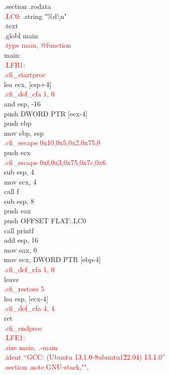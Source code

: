 \documentclass[12pt, letterpaper]{article}
\begin{document}
	\indent .section	.rodata\\
\textcolor{red}{
.LC0:}
	\indent .string	"\%d\textbackslash n"\\
	\indent .text\\
	\indent .globl	main\\
\textcolor{red}{
        \indent .type	main, @function}\\
main:\\
\textcolor{red}{
.LFB1:\\
	\indent .cfi\_startproc}\\
	\indent lea	ecx, [esp+4]\\
\textcolor{red}{
	\indent .cfi\_def\_cfa 1, 0}\\
	\indent and	esp, -16\\
	\indent push	DWORD PTR [ecx-4]\\
	\indent push	ebp\\
	\indent mov	ebp, esp\\
\textcolor{red}{
	\indent .cfi\_escape 0x10,0x5,0x2,0x75,0}\\
	\indent push	ecx\\
\textcolor{red}{
	\indent .cfi\_escape 0xf,0x3,0x75,0x7c,0x6}\\
	\indent sub	esp, 4\\
	\indent mov	ecx, 4\\
	\indent call	f\\
	\indent sub	esp, 8\\
	\indent push	eax\\
	\indent push	OFFSET FLAT:.LC0\\
	\indent call	printf\\
	\indent add	esp, 16\\
	\indent mov	eax, 0\\
	\indent mov	ecx, DWORD PTR [ebp-4]\\
\textcolor{red}{
	\indent .cfi\_def\_cfa 1, 0}\\
	\indent leave\\
\textcolor{red}{
	\indent .cfi\_restore 5}\\
	\indent lea	esp, [ecx-4]\\
\textcolor{red}{
	\indent .cfi\_def\_cfa 4, 4}\\
	\indent ret\\
\textcolor{red}{
	\indent .cfi\_endproc\\
.LFE1:\\
	\indent .size	main, .-main\\
	\indent .ident	``GCC: (Ubuntu 13.1.0-8ubuntu1\~22.04) 13.1.0''\\
	\indent .section	.note.GNU-stack,"",\@progbits}\\
    
\end{document}
